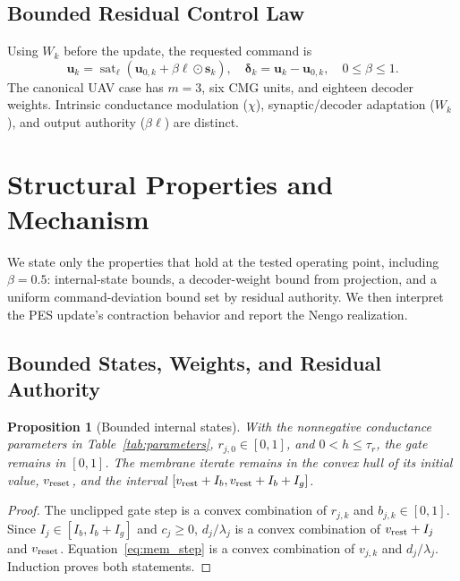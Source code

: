 \documentclass[letterpaper, 10 pt, conference]{ieeeconf}
\newcommand{\sat}{\operatorname{sat}}
\newtheorem{proposition}{Proposition}
\begin{document}
\subsection{Bounded Residual Control Law}
Using $W_k$ before the update, the requested command is
\begin{equation}
 \bm u_k=\sat_{\bm\ell}(\bm u_{0,k}+\beta\bm\ell\odot\bm s_k),\quad
 \bm\delta_k=\bm u_k-\bm u_{0,k},\quad 0\le\beta\le1.
 \label{eq:residual}
\end{equation}
The canonical UAV case has $m=3$, six CMG units, and eighteen decoder
weights. Intrinsic conductance modulation ($\chi$), synaptic/decoder
adaptation ($W_k$), and output authority ($\beta\bm\ell$) are distinct.

\section{Structural Properties and Mechanism}
\label{sec:properties}
We state only the properties that hold at the tested operating point,
including $\beta=0.5$: internal-state bounds, a decoder-weight bound from
projection, and a uniform command-deviation bound set by residual
authority. We then interpret the PES update's contraction behavior and
report the Nengo realization.

\subsection{Bounded States, Weights, and Residual Authority}
\begin{proposition}[Bounded internal states]\label{prop:states}
With the nonnegative conductance parameters in Table~\ref{tab:parameters},
$r_{j,0}\in[0,1]$, and $0<h\le\tau_r$, the gate remains in $[0,1]$.
The membrane iterate remains in the convex hull of its initial value,
$v_{\rm reset}$, and the interval
$[v_{\rm rest}+I_b,v_{\rm rest}+I_b+I_g]$.
\end{proposition}
\begin{proof}
The unclipped gate step is a convex combination of $r_{j,k}$ and
$b_{j,k}\in[0,1]$. Since $I_j\in[I_b,I_b+I_g]$ and $c_j\ge0$,
$d_j/\lambda_j$ is a convex combination of $v_{\rm rest}+I_j$ and
$v_{\rm reset}$. Equation~\eqref{eq:mem_step} is a convex combination of
$v_{j,k}$ and $d_j/\lambda_j$. Induction proves both statements.
\end{proof}
\end{document}
